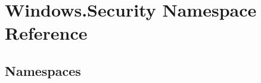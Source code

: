 \hypertarget{namespace_windows_1_1_security}{}\section{Windows.\+Security Namespace Reference}
\label{namespace_windows_1_1_security}
\subsection*{Namespaces}
\begin{DoxyCompactItemize}
\end{DoxyCompactItemize}
